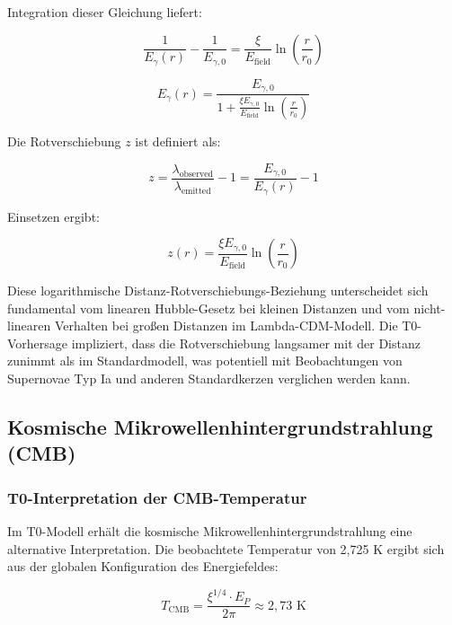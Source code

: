 \documentclass[12pt,a4paper]{article}
\theoremstyle{definition}
\begin{document}
Integration dieser Gleichung liefert:

\begin{equation}
\frac{1}{E_\gamma(r)} - \frac{1}{E_{\gamma,0}} = \frac{\xi}{E_{\text{field}}} \ln\left(\frac{r}{r_0}\right)
\end{equation}

\begin{equation}
E_\gamma(r) = \frac{E_{\gamma,0}}{1 + \frac{\xi E_{\gamma,0}}{E_{\text{field}}} \ln\left(\frac{r}{r_0}\right)}
\end{equation}

Die Rotverschiebung $z$ ist definiert als:

\begin{equation}
z = \frac{\lambda_{\text{observed}}}{\lambda_{\text{emitted}}} - 1 = \frac{E_{\gamma,0}}{E_\gamma(r)} - 1
\end{equation}

Einsetzen ergibt:

\begin{equation}
\boxed{z(r) = \frac{\xi E_{\gamma,0}}{E_{\text{field}}} \ln\left(\frac{r}{r_0}\right)}
\end{equation}

\begin{wichtig}
Diese logarithmische Distanz-Rotverschiebungs-Beziehung unterscheidet sich fundamental vom linearen Hubble-Gesetz bei kleinen Distanzen und vom nicht-linearen Verhalten bei großen Distanzen im Lambda-CDM-Modell. Die T0-Vorhersage impliziert, dass die Rotverschiebung langsamer mit der Distanz zunimmt als im Standardmodell, was potentiell mit Beobachtungen von Supernovae Typ Ia und anderen Standardkerzen verglichen werden kann.
\end{wichtig}

\subsection{Kosmische Mikrowellenhintergrundstrahlung (CMB)}

\subsubsection{T0-Interpretation der CMB-Temperatur}

Im T0-Modell erhält die kosmische Mikrowellenhintergrundstrahlung eine alternative Interpretation. Die beobachtete Temperatur von 2,725 K ergibt sich aus der globalen Konfiguration des Energiefeldes:

\begin{equation}
T_{\text{CMB}} = \frac{\xi^{1/4} \cdot E_P}{2\pi} \approx 2,73 \text{ K}
\end{equation}
\end{document}
